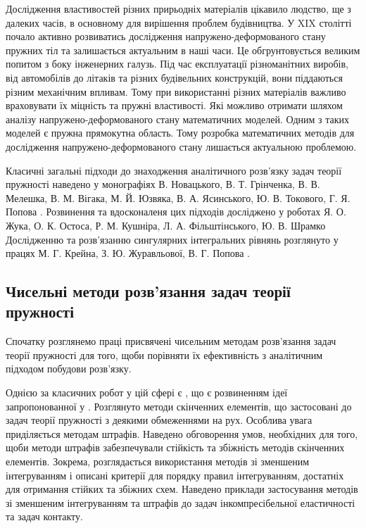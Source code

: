 
Дослідження властивостей різних прирьодніх матеріалів цікавило людство, ще з далеких часів,
в основному для вирішення проблем будівництва.
У XIX столітті почало активно розвиватись дослідження напружено-деформованого стану пружних тіл та залишається актуальним в наші часи.
Це обгрунтовується великим попитом з боку інженерних галузь.
Під час експлуатації різноманітних виробів, від автомобілів до літаків та різних будівельних конструкцій, вони піддаються різним механічним впливам.
Тому при використанні різних матеріалів важливо враховувати їх міцність та пружні властивості.
Які можливо отримати шляхом аналізу напружено-деформованого стану математичних моделей.
Одним з таких моделей є пружна прямокутна область.
Тому розробка математичних методів для дослідження напружено-деформованого стану лишається актуальною проблемою.

Класичні загальні підходи до знаходження аналітичного розв'язку задач теорії пружності наведено у монографіях
В. Новацького, В. Т. Грінченка, В. В. Мелешка, В. М. Вігака, М. Й. Юзвяка, В. А. Ясинського, Ю. В. Токового, Г. Я. Попова \cite{novacki_1, meleshko_1, vihak_1, vihak_2, popov_1}.
Розвинення та вдосконаленя цих підходів досліджено у роботах Я. О. Жука, О. К. Остоса, Р. М. Кушніра, Л. А. Фільштінського, Ю. В. Шрамко \cite{zhuk_1,kushnir_1, filshtin_1}
Дослідженню та розв'язанню сингулярних інтегральних рівнянь розглянуто у працях М. Г. Крейна, З. Ю. Журавльової, В. Г. Попова \cite{kreyn_1, zhuravleva_1,popov_v_1}.

\subsection{Чисельні методи розв'язання задач теорії пружності}
Спочатку розглянемо праці присвячені чисельним методам розв'язання задач теорії пружності
для того, щоби порівняти їх ефективність з аналітичним підходом побудови розв'язку.

Однією за класичних робот у цій сфері є \cite{oden_1}, що є розвиненням ідеї запропонованної у \cite{babushka_1}.
Розглянуто методи скінченних елементів, що застосовані до задач теорії пружності з деякими обмеженнями на рух.
Особлива увага приділяється методам штрафів.
Наведено обговорення умов, необхідних для того, щоби методи штрафів забезпечували стійкість та збіжність методів скінченних елементів.
Зокрема, розглядається використання методів зі зменшеним інтегруванням і описані критерії для порядку правил інтегруванням, достатніх для отримання стійких та збіжних схем.
Наведено приклади застосування методів зі зменшеним інтегруванням та штрафів до задач інкомпресібельної еластичності та задач контакту.

